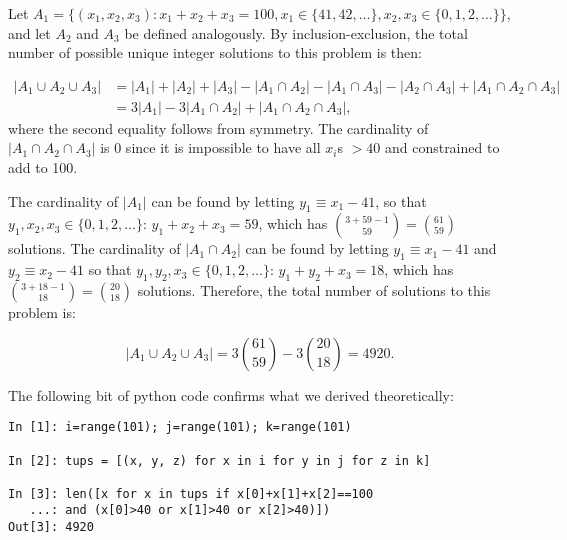 \begin{problem}{21}
Let $A_1 = \{ (x_1, x_2, x_3): x_1+x_2+x_3 = 100, x_1 \in \{41, 42, \ldots \}, x_2, x_3 \in \{0, 1, 2, \ldots \} \}$, and let $A_2$ and $A_3$ be defined analogously.  By inclusion-exclusion, the total number of possible unique integer solutions to this problem is then:

\begin{align*}
|A_1 \cup A_2 \cup A_3| & = |A_1| + |A_2| + |A_3| -|A_1\cap A_2|  -|A_1\cap A_3|  -|A_2\cap A_3| +|A_1 \cap A_2 \cap A_3| \\
& = 3 |A_1|-3|A_1\cap A_2|+|A_1 \cap A_2 \cap A_3|,
\end{align*}
where the second equality follows from symmetry.  The cardinality of $|A_1 \cap A_2 \cap A_3|$ is 0 since it is impossible to have all $x_i$s $> 40$ and constrained to add to 100.

The cardinality of $|A_1|$ can be found by letting $y_1 \equiv x_1-41$, so that $y_1, x_2, x_3 \in \{0, 1, 2, \ldots \}$: $y_1+x_2+x_3 =59$, which has $\binom{3+59-1}{59}=\binom{61}{59}$ solutions.  The cardinality of $|A_1 \cap A_2|$ can be found by letting $y_1 \equiv x_1-41$ and $y_2 \equiv x_2-41$ so that $y_1, y_2, x_3 \in \{0, 1, 2, \ldots \}$: $y_1+y_2+x_3 =18$, which has $\binom{3+18-1}{18}=\binom{20}{18}$ solutions.  Therefore, the total number of solutions to this problem is:

\begin{equation*}
|A_1 \cup A_2 \cup A_3| = 3\binom{61}{59}-3\binom{20}{18} = 4920.
\end{equation*}

The following bit of python code confirms what we derived theoretically:
\begin{lstlisting}
In [1]: i=range(101); j=range(101); k=range(101)

In [2]: tups = [(x, y, z) for x in i for y in j for z in k]

In [3]: len([x for x in tups if x[0]+x[1]+x[2]==100 
   ...: and (x[0]>40 or x[1]>40 or x[2]>40)])
Out[3]: 4920
\end{lstlisting}

\end{problem}




